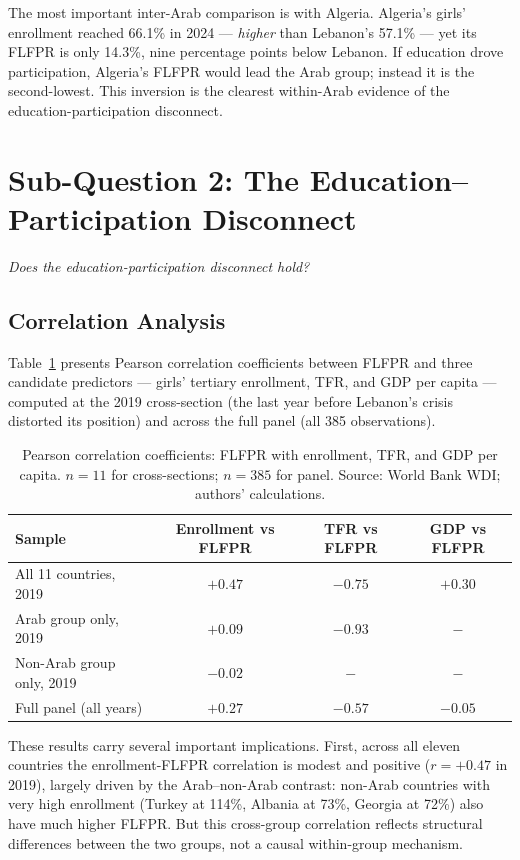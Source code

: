 \documentclass[12pt,a4paper]{article}
\begin{document}
The most important inter-Arab comparison is with Algeria. Algeria's girls' enrollment reached 66.1\% in 2024 --- \textit{higher} than Lebanon's 57.1\% --- yet its FLFPR is only 14.3\%, nine percentage points below Lebanon. If education drove participation, Algeria's FLFPR would lead the Arab group; instead it is the second-lowest. This inversion is the clearest within-Arab evidence of the education-participation disconnect.

\section{Sub-Question 2: The Education--Participation Disconnect}
\label{sec:paradox}

\textit{Does the education-participation disconnect hold?}

\subsection{Correlation Analysis}

Table~\ref{tab:corr} presents Pearson correlation coefficients between FLFPR and three candidate predictors --- girls' tertiary enrollment, TFR, and GDP per capita --- computed at the 2019 cross-section (the last year before Lebanon's crisis distorted its position) and across the full panel (all 385 observations).

\begin{table}[H]
\centering
\caption{Pearson correlation coefficients: FLFPR with enrollment, TFR, and GDP per capita. $n=11$ for cross-sections; $n=385$ for panel. Source: World Bank WDI; authors' calculations.}
\label{tab:corr}
\begin{tabular}{lccc}
\toprule
\textbf{Sample} & \textbf{Enrollment vs FLFPR} & \textbf{TFR vs FLFPR} & \textbf{GDP vs FLFPR} \\
\midrule
All 11 countries, 2019        & $+0.47$ & $-0.75$ & $+0.30$ \\
Arab group only, 2019         & $+0.09$ & $-0.93$ & $-$      \\
Non-Arab group only, 2019     & $-0.02$ & $-$     & $-$      \\
Full panel (all years)        & $+0.27$ & $-0.57$ & $-0.05$ \\
\bottomrule
\end{tabular}
\end{table}

These results carry several important implications. First, across all eleven countries the enrollment-FLFPR correlation is modest and positive ($r = +0.47$ in 2019), largely driven by the Arab--non-Arab contrast: non-Arab countries with very high enrollment (Turkey at 114\%, Albania at 73\%, Georgia at 72\%) also have much higher FLFPR. But this cross-group correlation reflects structural differences between the two groups, not a causal within-group mechanism.
\end{document}
